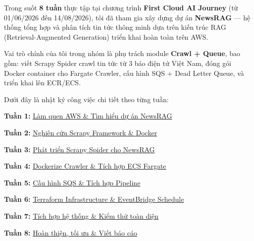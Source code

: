 Trong suốt \textbf{8 tuần} thực tập tại chương trình \textbf{First Cloud
AI Journey} (từ 01/06/2026 đến 14/08/2026), tôi đã tham gia xây dựng dự
án \textbf{NewsRAG} --- hệ thống tổng hợp và phân tích tin tức thông
minh dựa trên kiến trúc RAG (Retrieval-Augmented Generation) triển khai
hoàn toàn trên AWS.

Vai trò chính của tôi trong nhóm là phụ trách module \textbf{Crawl +
Queue}, bao gồm: viết Scrapy Spider crawl tin tức từ 3 báo điện tử Việt
Nam, đóng gói Docker container cho Fargate Crawler, cấu hình SQS + Dead
Letter Queue, và triển khai lên ECR/ECS.

Dưới đây là nhật ký công việc chi tiết theo từng tuần:

\textbf{Tuần 1:} \href{1.1-week1/}{Làm quen AWS \& Tìm hiểu dự án
NewsRAG}

\textbf{Tuần 2:} \href{1.2-week2/}{Nghiên cứu Scrapy Framework \&
Docker}

\textbf{Tuần 3:} \href{1.3-week3/}{Phát triển Scrapy Spider cho NewsRAG}

\textbf{Tuần 4:} \href{1.4-week4/}{Dockerize Crawler \& Tích hợp ECS
Fargate}

\textbf{Tuần 5:} \href{1.5-week5/}{Cấu hình SQS \& Tích hợp Pipeline}

\textbf{Tuần 6:} \href{1.6-week6/}{Terraform Infrastructure \&
EventBridge Schedule}

\textbf{Tuần 7:} \href{1.7-week7/}{Tích hợp hệ thống \& Kiểm thử toàn
diện}

\textbf{Tuần 8:} \href{1.8-week8/}{Hoàn thiện, tối ưu \& Viết báo cáo}
